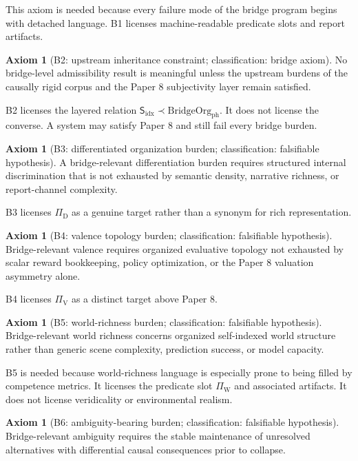 \documentclass[11pt,a4paper]{article}
\theoremstyle{definition}
\newtheorem{axiom}[theorem]{Axiom}
\newcommand{\Subfp}{\mathsf{S}_{\mathrm{idx}}}
\newcommand{\BridgeClass}{\mathrm{BridgeOrg}_{\mathrm{ph}}}
\newcommand{\PiD}{\Pi_{\mathrm{D}}}
\newcommand{\PiV}{\Pi_{\mathrm{V}}}
\newcommand{\PiW}{\Pi_{\mathrm{W}}}
\begin{document}
This axiom is needed because every failure mode of the bridge program begins with detached language. B1 licenses machine-readable predicate slots and report artifacts. 

\begin{axiom}[B2: upstream inheritance constraint; classification: bridge axiom]
No bridge-level admissibility result is meaningful unless the upstream burdens of the causally rigid corpus and the Paper 8 subjectivity layer remain satisfied.
\end{axiom}

B2 licenses the layered relation $\Subfp \prec \BridgeClass$. It does not license the converse. A system may satisfy Paper 8 and still fail every bridge burden.

\begin{axiom}[B3: differentiated organization burden; classification: falsifiable hypothesis]
A bridge-relevant differentiation burden requires structured internal discrimination that is not exhausted by semantic density, narrative richness, or report-channel complexity.
\end{axiom}

B3 licenses $\PiD$ as a genuine target rather than a synonym for rich representation. 

\begin{axiom}[B4: valence topology burden; classification: falsifiable hypothesis]
Bridge-relevant valence requires organized evaluative topology not exhausted by scalar reward bookkeeping, policy optimization, or the Paper 8 valuation asymmetry alone.
\end{axiom}

B4 licenses $\PiV$ as a distinct target above Paper 8. 

\begin{axiom}[B5: world-richness burden; classification: falsifiable hypothesis]
Bridge-relevant world richness concerns organized self-indexed world structure rather than generic scene complexity, prediction success, or model capacity.
\end{axiom}

B5 is needed because world-richness language is especially prone to being filled by competence metrics. It licenses the predicate slot $\PiW$ and associated artifacts. It does not license veridicality or environmental realism.

\begin{axiom}[B6: ambiguity-bearing burden; classification: falsifiable hypothesis]
Bridge-relevant ambiguity requires the stable maintenance of unresolved alternatives with differential causal consequences prior to collapse.
\end{axiom}
\end{document}
